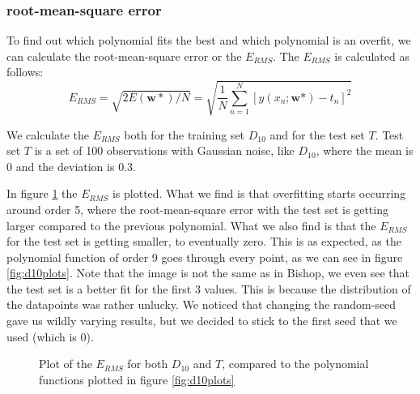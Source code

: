 \documentclass[11pt]{article}
\begin{document}
\subsubsection{root-mean-square error}
\label{sec:d10error}
To find out which polynomial fits the best and which polynomial is an overfit, we can calculate the root-mean-square error or the $E_{RMS}$. The $E_{RMS}$ is calculated as follows:
\[
E_{RMS} = \sqrt{2E(\mathbf{w*})/N} = \sqrt{\frac{1}{N} \sum^N_{n=1} \left[y(x_n;\textbf{w*})-t_n\right]^2}
\]

We calculate the $E_{RMS}$ both for the training set $D_{10}$ and for the test set $T$. Test set $T$ is a set of 100 observations with Gaussian noise, like $D_{10}$, where the mean is 0 and the deviation is 0.3.

In figure \ref{fig:d10error} the $E_{RMS}$ is plotted. What we find is that overfitting starts occurring around order 5, where the root-mean-square error with the test set is getting larger compared to the previous polynomial. What we also find is that the $E_{RMS}$ for the test set is getting smaller, to eventually zero. This is as expected, as the polynomial function of order 9 goes through every point, as we can see in figure \ref{fig:d10plots}. Note that the image is not the same as in Bishop, we even see that the test set is a better fit for the first 3 values. This is because the distribution of the datapoints was rather unlucky. We noticed that changing the random-seed gave us wildly varying results, but we decided to stick to the first seed that we used (which is $0$).


\begin{figure}[H]
\centering
	\centering
	\caption{Plot of the $E_{RMS}$ for both $D_{10}$ and $T$, compared to the polynomial functions plotted in figure \ref{fig:d10plots}}
	\label{fig:d10error}

\end{figure}
\end{document}
